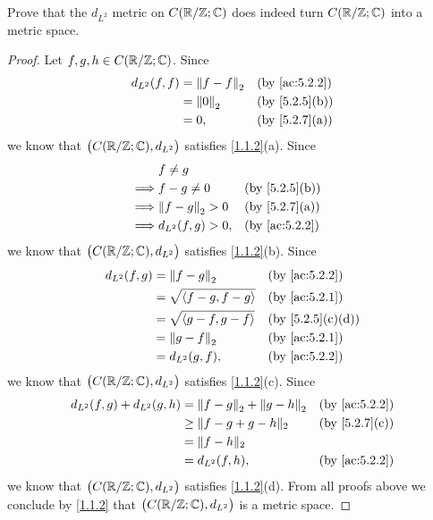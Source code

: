 \begin{ex}\label{ex:5.2.4}
  Prove that the \(d_{L^2}\) metric on \(C(\mathbb{R} / \mathbb{Z} ; \mathbb{C})\) does indeed turn \(C(\mathbb{R} / \mathbb{Z} ; \mathbb{C})\) into a metric space.
\end{ex}

\begin{proof}
  Let \(f, g, h \in C(\mathbb{R} / \mathbb{Z} ; \mathbb{C})\).
  Since
  \begin{align*}
    d_{L^2}(f, f) & = \norm*{f - f}_2 &  & \by{ac:5.2.2}               \\
                  & = \norm*{0}_2     &  & \text{(by \cref{5.2.5}(b))} \\
                  & = 0,              &  & \text{(by \cref{5.2.7}(a))}
  \end{align*}
  we know that \(\big(C(\mathbb{R} / \mathbb{Z} ; \mathbb{C}), d_{L^2}\big)\) satisfies \cref{1.1.2}(a).
  Since
  \begin{align*}
             & f \neq g                                             \\
    \implies & f - g \neq 0        &  & \text{(by \cref{5.2.5}(b))} \\
    \implies & \norm*{f - g}_2 > 0 &  & \text{(by \cref{5.2.7}(a))} \\
    \implies & d_{L^2}(f, g) > 0,  &  & \by{ac:5.2.2}
  \end{align*}
  we know that \(\big(C(\mathbb{R} / \mathbb{Z} ; \mathbb{C}), d_{L^2}\big)\) satisfies \cref{1.1.2}(b).
  Since
  \begin{align*}
    d_{L^2}(f, g) & = \norm*{f - g}_2              &  & \by{ac:5.2.2}                  \\
                  & = \sqrt{\inner*{f - g, f - g}} &  & \by{ac:5.2.1}                  \\
                  & = \sqrt{\inner*{g - f, g - f}} &  & \text{(by \cref{5.2.5}(c)(d))} \\
                  & = \norm*{g - f}_2              &  & \by{ac:5.2.1}                  \\
                  & = d_{L^2}(g, f),               &  & \by{ac:5.2.2}
  \end{align*}
  we know that \(\big(C(\mathbb{R} / \mathbb{Z} ; \mathbb{C}), d_{L^2}\big)\) satisfies \cref{1.1.2}(c).
  Since
  \begin{align*}
    d_{L^2}(f, g) + d_{L^2}(g, h) & = \norm*{f - g}_2 + \norm*{g - h}_2 &  & \by{ac:5.2.2}               \\
                                  & \geq \norm{f - g + g - h}_2         &  & \text{(by \cref{5.2.7}(c))} \\
                                  & = \norm{f - h}_2                                                     \\
                                  & = d_{L^2}(f, h),                    &  & \by{ac:5.2.2}
  \end{align*}
  we know that \(\big(C(\mathbb{R} / \mathbb{Z} ; \mathbb{C}), d_{L^2}\big)\) satisfies \cref{1.1.2}(d).
  From all proofs above we conclude by \cref{1.1.2} that \(\big(C(\mathbb{R} / \mathbb{Z} ; \mathbb{C}), d_{L^2}\big)\) is a metric space.
\end{proof}


